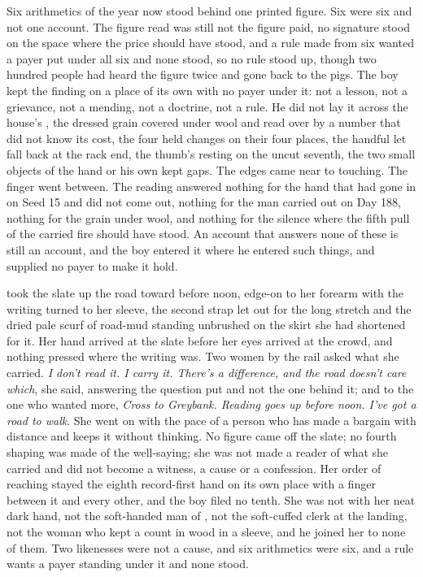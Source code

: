 Six arithmetics of the year now stood behind one printed figure. Six were six and not one account. The figure read was still not the figure paid, no signature stood on the space where the price should have stood, and a rule made from six wanted a payer put under all six and none stood, so no rule stood up, though two hundred people had heard the figure twice and gone back to the pigs. The boy kept the finding on a place of its own with no payer under it: not a lesson, not a grievance, not a mending, not a doctrine, not a rule. He did not lay it across the house's , the dressed grain covered under wool and read over by a number that did not know its cost, the four held changes on their four places, the handful let fall back at the rack end, the thumb's resting on the uncut seventh, the two small objects of the hand or his own kept gaps. The edges came near to touching. The finger went between. The reading answered nothing for the hand that had gone in on Seed 15 and did not come out, nothing for the man carried out on Day 188, nothing for the grain under wool, and nothing for the silence where the fifth pull of the carried fire should have stood. An account that answers none of these is still an account, and the boy entered it where he entered such things, and supplied no payer to make it hold.

\scenebreak

 took the slate up the road toward  before noon, edge-on to her forearm with the writing turned to her sleeve, the second strap let out for the long stretch and the dried pale scurf of road-mud standing unbrushed on the skirt she had shortened for it. Her hand arrived at the slate before her eyes arrived at the crowd, and nothing pressed where the writing was. Two women by the rail asked what she carried. \emph{I don't read it. I carry it. There's a difference, and the road doesn't care which}, she said, answering the question put and not the one behind it; and to the one who wanted more, \emph{Cross to Greybank. Reading goes up before noon. I've got a road to walk}. She went on with the pace of a person who has made a bargain with distance and keeps it without thinking. No figure came off the slate; no fourth shaping was made of the well-saying; she was not made a reader of what she carried and did not become a witness, a cause or a confession. Her order of reaching stayed the eighth record-first hand on its own place with a finger between it and every other, and the boy filed no tenth. She was not  with her neat dark hand, not the soft-handed man of , not the soft-cuffed clerk at the landing, not the woman who kept a count in wood in a sleeve, and he joined her to none of them. Two likenesses were not a cause, and six arithmetics were six, and a rule wants a payer standing under it and none stood.

